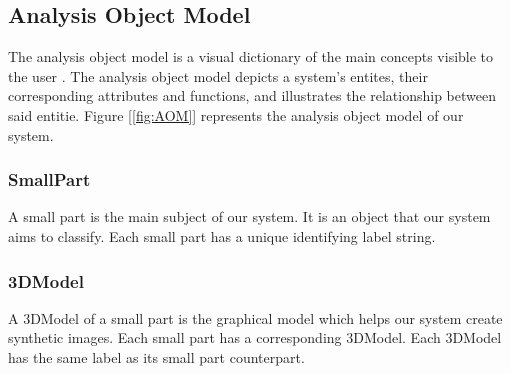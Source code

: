 \begin{usecase}




\end{usecase}

\clearpage
\subsection{Analysis Object Model}

The analysis object model is a visual dictionary of the main concepts visible to the user \cite{bruegge2004object}. The analysis object model depicts a system's entites, their corresponding attributes and functions, and illustrates the relationship between said entitie. Figure [\ref{fig:AOM}] represents the analysis object model of our system.

\subsubsection{SmallPart}
A small part is the main subject of our system. It is an object that our system aims to classify. Each small part has a unique identifying label string.

\subsubsection{3DModel}
A 3DModel of a small part is the graphical model which helps our system create synthetic images. Each small part has a corresponding 3DModel. Each 3DModel has the same label as its small part counterpart.

